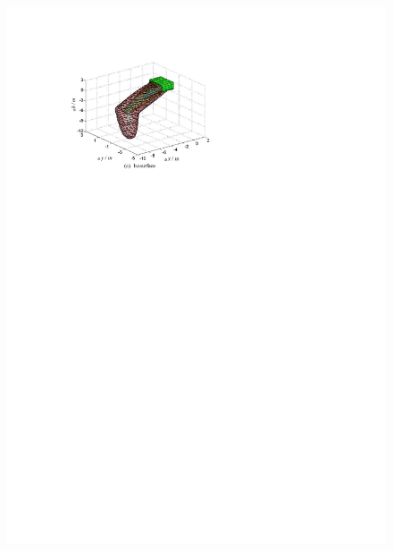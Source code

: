 \begin{figure}[h]
	\centering
	\begin{minipage}{0.45\linewidth}
		\centering
		\includegraphics[width=1\linewidth]{Figures/Figs_Ch13/Fig7_1}
	\end{minipage}	\qquad
	\begin{minipage}{0.45\linewidth}
		\centering

\end{minipage}
\end{figure}
